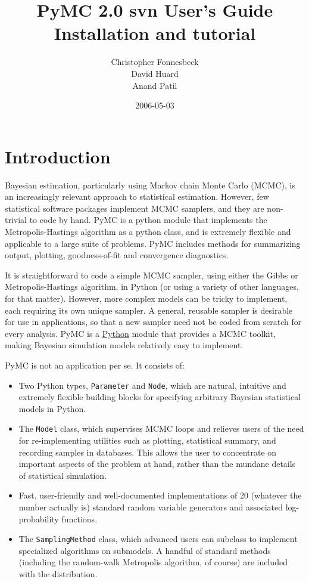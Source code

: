 \documentclass[]{book}
\title{PyMC 2.0 svn User's Guide \\
Installation and tutorial}
\author{ Christopher Fonnesbeck\\ David Huard \\ Anand Patil }
\date{2006-05-03}
\begin{document}
\ifpdf
{}
\else
{}
\fi

\maketitle

\tableofcontents

\chapter{Introduction} %

Bayesian estimation, particularly using Markov chain Monte Carlo (MCMC), is an increasingly relevant approach to statistical estimation. However, few statistical software packages implement MCMC samplers, and they are non-trivial to code by hand. PyMC is a python module that implements the Metropolis-Hastings algorithm as a python class, and is extremely flexible and applicable to a large suite of problems. PyMC includes methods for summarizing output, plotting, goodness-of-fit and convergence diagnostics.

It is straightforward to code a simple MCMC sampler, using either the Gibbs or Metropolis-Hastings algorithm, in Python (or using a variety of other languages, for that matter). However, more complex models can be tricky to implement, each requiring its own unique sampler. A general, reusable sampler is desirable for use in applications, so that a new sampler need not be coded from scratch for every analysis. PyMC is a \href{http://python.org}{Python} module that provides a MCMC toolkit, making Bayesian simulation models relatively easy to implement. 

\bigskip
PyMC is not an application per se. It consists of: 
\begin{itemize}
	\item Two Python types, \texttt{Parameter} and \texttt{Node}, which are natural, intuitive and extremely flexible building blocks for specifying arbitrary Bayesian statistical models in Python.
	\item The \texttt{Model} class, which supervises MCMC loops and relieves users of the need for re-implementing utilities such as plotting, statistical summary, and recording samples in databases. This allows the user to concentrate on important aspects of the problem at hand, rather than the mundane details of statistical simulation.
	\item Fast, user-friendly and well-documented implementations of 20 (whatever the number actually is) standard random variable generators and associated log-probability functions.
	\item The \texttt{SamplingMethod} class, which advanced users can subclass to implement specialized algorithms on submodels. A handful of standard methods (including the random-walk Metropolis algorithm, of course) are included with the distribution.
\end{itemize}
\end{document}
